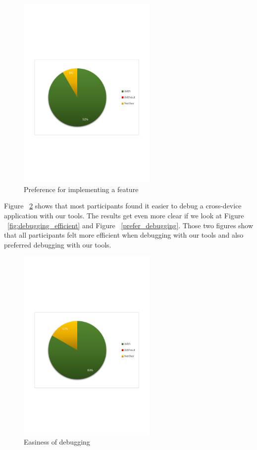 \begin{figure}[H]
  \centering
    \includegraphics[width=0.6\textwidth]{images/charts/prefer_implementing.pdf}
	\caption{Preference for implementing a feature}
	\label{fig:prefer_implementing}
\end{figure}

Figure ~\ref{fig:debugging_easier} shows that most participants found it easier to debug a cross-device application with our tools. The results get even more clear if we look at Figure ~\ref{fig:debugging_efficient} and Figure ~\ref{prefer_debugging}. Those two figures show that all participants felt more efficient when debugging with our tools and also preferred debugging with our tools.

\begin{figure}[H]
  \centering
    \includegraphics[width=0.6\textwidth]{images/charts/debugging_easier.pdf}
	\caption{Easiness of debugging}
	\label{fig:debugging_easier}
\end{figure}

